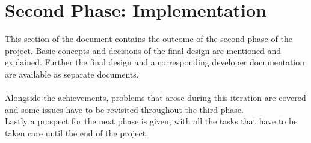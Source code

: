 \section{Second Phase: Implementation}
This section of the document contains the outcome of the second phase of the project. Basic concepts and decisions of the final design are mentioned and explained. Further the final design and a corresponding developer documentation are available as separate documents. \\
~\\
Alongside the achievements, problems that arose during this iteration are covered and some issues have to be revisited throughout the third phase. \\
Lastly a prospect for the next phase is given, with all the tasks that have to be taken care until the end of the project. 